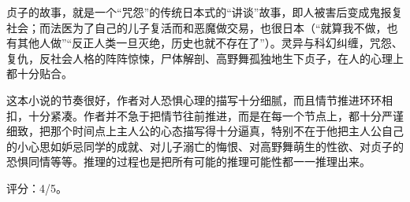 贞子的故事，就是一个“咒怨”的传统日本式的“讲谈”故事，即人被害后变成鬼报复社会；而法医为了自己的儿子复活而和恶魔做交易，也很日本（“就算我不做，也有其他人做”“反正人类一旦灭绝，历史也就不存在了”）。灵异与科幻纠缠，咒怨、复仇，反社会人格的阵阵惊悚，尸体解剖、高野舞孤独地生下贞子，在人的心理上都十分贴合。

这本小说的节奏很好，作者对人恐惧心理的描写十分细腻，而且情节推进环环相扣，十分紧凑。作者并不急于把情节往前推进，而是在每一个节点上，都十分严谨细致，把那个时间点上主人公的心态描写得十分逼真，特别不在于他把主人公自己的小心思如妒忌同学的成就、对儿子溺亡的悔恨、对高野舞萌生的性欲、对贞子的恐惧同情等等。推理的过程也是把所有可能的推理可能性都一一推理出来。

评分：4/5。